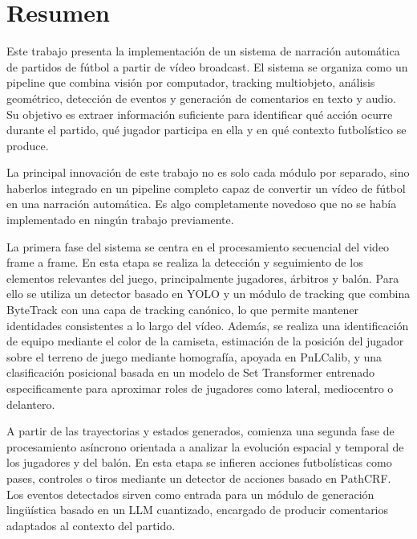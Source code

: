 \chapter*{\textbf{Resumen}}
\vspace{-2cm}

\begingroup
\setlength{\parskip}{0.8em}
\setlength{\parindent}{0pt}

Este trabajo presenta la implementación de un sistema de narración automática de partidos de fútbol a partir de vídeo broadcast. El sistema se organiza como un pipeline que combina visión por computador, tracking multiobjeto, análisis geométrico, detección de eventos y generación de comentarios en texto y audio. Su objetivo es extraer información suficiente para identificar qué acción ocurre durante el partido, qué jugador participa en ella y en qué contexto futbolístico se produce.

La principal innovación de este trabajo no es solo cada módulo por separado, sino haberlos integrado en un pipeline completo capaz de convertir un vídeo de fútbol en una narración automática. Es algo completamente novedoso que no se había implementado en ningún trabajo previamente.

La primera fase del sistema se centra en el procesamiento secuencial del video frame a frame. En esta etapa se realiza la detección y seguimiento de los elementos relevantes del juego, principalmente jugadores, árbitros y balón. Para ello se utiliza un detector basado en YOLO y un módulo de tracking que combina ByteTrack con una capa de tracking canónico, lo que permite mantener identidades consistentes a lo largo del vídeo. Además, se realiza una identificación de equipo mediante el color de la camiseta, estimación de la posición del jugador sobre el terreno de juego mediante homografía, apoyada en PnLCalib, y una clasificación posicional basada en un modelo de Set Transformer entrenado especificamente para aproximar roles de jugadores como lateral, mediocentro o delantero.

A partir de las trayectorias y estados generados, comienza una segunda fase de procesamiento asíncrono orientada a analizar la evolución espacial y temporal de los jugadores y del balón. En esta etapa se infieren acciones futbolísticas como pases, controles o tiros mediante un detector de acciones basado en PathCRF. Los eventos detectados sirven como entrada para un módulo de generación lingüística basado en un LLM cuantizado, encargado de producir comentarios adaptados al contexto del partido.

